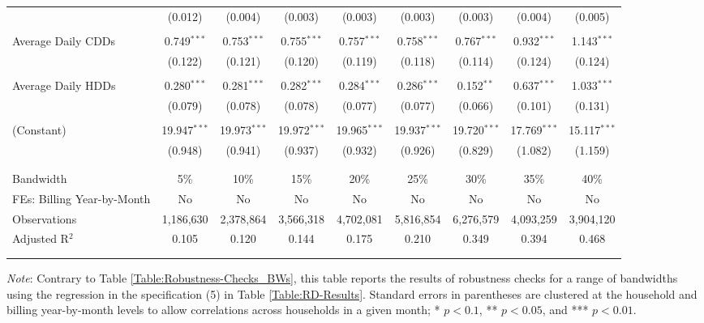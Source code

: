 {\begin{table}[t!]
\begin{adjustbox}{scale = 0.76}
\begin{threeparttable}
\begin{tabular}{@{\extracolsep{5pt}}lcccccccc}
                    & (0.012) & (0.004) & (0.003) & (0.003) & (0.003) & (0.003) & (0.004) & (0.005) \\ 
                    & & & & & & & & \\ 
                    Average Daily CDDs & 0.749$^{***}$ & 0.753$^{***}$ & 0.755$^{***}$ & 0.757$^{***}$ & 0.758$^{***}$ & 0.767$^{***}$ & 0.932$^{***}$ & 1.143$^{***}$ \\ 
                    & (0.122) & (0.121) & (0.120) & (0.119) & (0.118) & (0.114) & (0.124) & (0.124) \\ 
                    & & & & & & & & \\ 
                    Average Daily HDDs & 0.280$^{***}$ & 0.281$^{***}$ & 0.282$^{***}$ & 0.284$^{***}$ & 0.286$^{***}$ & 0.152$^{**}$ & 0.637$^{***}$ & 1.033$^{***}$ \\ 
                    & (0.079) & (0.078) & (0.078) & (0.077) & (0.077) & (0.066) & (0.101) & (0.131) \\ 
                    & & & & & & & & \\ 
                    (Constant) & 19.947$^{***}$ & 19.973$^{***}$ & 19.972$^{***}$ & 19.965$^{***}$ & 19.937$^{***}$ & 19.720$^{***}$ & 17.769$^{***}$ & 15.117$^{***}$ \\ 
                    & (0.948) & (0.941) & (0.937) & (0.932) & (0.926) & (0.829) & (1.082) & (1.159) \\ 
                    & & & & & & & & \\
                    \hline
                    \\[-2.0ex]
                    Bandwidth & 5\% & 10\% & 15\% & 20\% & 25\% & 30\% & 35\% & 40\% \\ 
                    FEs: Billing Year-by-Month & No & No & No & No & No & No & No & No \\ 
                    Observations & 1,186,630 & 2,378,864 & 3,566,318 & 4,702,081 & 5,816,854 & 6,276,579 & 4,093,259 & 3,904,120 \\ 
                    Adjusted R$^{2}$ & 0.105 & 0.120 & 0.144 & 0.175 & 0.210 & 0.349 & 0.394 & 0.468 \\
                    \\[-2.0ex]
                    \hline \hline
                    \\[-4.5ex]
                \end{tabular}
                \begin{tablenotes}[flushleft]
                    \footnotesize
                    \item \textit{Note}: Contrary to Table \ref{Table:Robustness-Checks_BWs}, this table reports the results of robustness checks for a range of bandwidths using the regression in the specification (5) in Table \ref{Table:RD-Results}. Standard errors in parentheses are clustered at the household and billing year-by-month levels to allow correlations across households in a given month; * $p < 0.1$, ** $p < 0.05$, and *** $p < 0.01$.

\end{tablenotes}
\end{threeparttable}
\end{adjustbox}
\end{table}}
